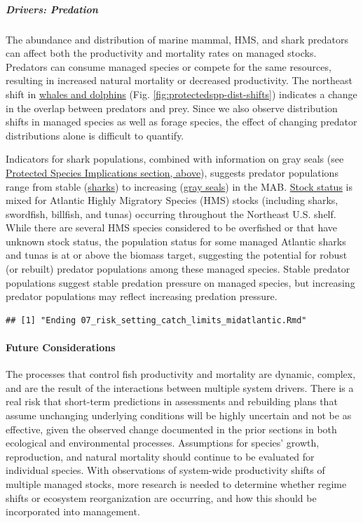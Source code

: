 \documentclass[
  10pt,
]{article}
\begin{document}
\subparagraph{Drivers: Predation}\label{drivers-predation}

The abundance and distribution of marine mammal, HMS, and shark predators can affect both the productivity and mortality rates on managed stocks. Predators can consume managed species or compete for the same resources, resulting in increased natural mortality or decreased productivity. The northeast shift in \href{https://noaa-edab.github.io/catalog/cetacean_dist.html}{whales and dolphins} (Fig. \ref{fig:protectedspp-dist-shifts}) indicates a change in the overlap between predators and prey. Since we also observe distribution shifts in managed species as well as forage species, the effect of changing predator distributions alone is difficult to quantify.

Indicators for shark populations, combined with information on gray seals (see \hyperref[protected-species]{Protected Species Implications section, above}), suggests predator populations range from stable (\href{https://noaa-edab.github.io/catalog/hms_cpue.html}{sharks}) to increasing (\href{https://noaa-edab.github.io/catalog/seal_pups.html}{gray seals}) in the MAB. \href{https://noaa-edab.github.io/catalog/hms_stock_status.html}{Stock status} is mixed for Atlantic Highly Migratory Species (HMS) stocks (including sharks, swordfish, billfish, and tunas) occurring throughout the Northeast U.S. shelf. While there are several HMS species considered to be overfished or that have unknown stock status, the population status for some managed Atlantic sharks and tunas is at or above the biomass target, suggesting the potential for robust (or rebuilt) predator populations among these managed species. Stable predator populations suggest stable predation pressure on managed species, but increasing predator populations may reflect increasing predation pressure.

\begin{verbatim}
## [1] "Ending 07_risk_setting_catch_limits_midatlantic.Rmd"
\end{verbatim}

\paragraph{Future Considerations}\label{future-considerations-2}

The processes that control fish productivity and mortality are dynamic, complex, and are the result of the interactions between multiple system drivers. There is a real risk that short-term predictions in assessments and rebuilding plans that assume unchanging underlying conditions will be highly uncertain and not be as effective, given the observed change documented in the prior sections in both ecological and environmental processes. Assumptions for species' growth, reproduction, and natural mortality should continue to be evaluated for individual species. With observations of system-wide productivity shifts of multiple managed stocks, more research is needed to determine whether regime shifts or ecosystem reorganization are occurring, and how this should be incorporated into management.
\end{document}
